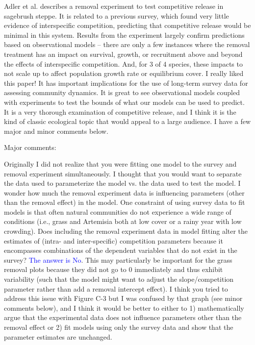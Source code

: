 \documentclass[12pt]{article}
\newcommand{\response}{\textcolor{blue}}
\begin{document}
{Adler et al. describes a removal experiment to test competitive release in sagebrush steppe. It is related to a previous survey, which found very little evidence of interspecific competition, predicting that competitive release would be minimal in this system. Results from the experiment largely confirm predictions based on observational models – there are only a few instances where the removal treatment has an impact on survival, growth, or recruitment above and beyond the effects of interspecific competition. And, for 3 of 4 species, these impacts to not scale up to affect population growth rate or equilibrium cover. I really liked this paper! It has important implications for the use of long-term survey data for assessing community dynamics. It is great to see observational models coupled with experiments to test the bounds of what our models can be used to predict. It is a very thorough examination of competitive release, and I think it is the kind of classic ecological topic that would appeal to a large audience. I have a few major and minor comments below.

Major comments:

Originally I did not realize that you were fitting one model to the survey and removal experiment simultaneously. I thought that you would want to separate the data used to parameterize the model vs. the data used to test the model.  I wonder how much the removal experiment data is influencing parameters (other than the removal effect) in the model. One constraint of using survey data to fit models is that often natural communities do not experience a wide range of conditions (i.e., grass and Artemisia both at low cover or a rainy year with low crowding). Does including the removal experiment data in model fitting alter the estimates of (intra- and inter-specific) competition parameters because it encompasses combinations of the dependent variables that do not exist in the survey? \response{The answer is No}. This may particularly be important for the grass removal plots because they did not go to 0 immediately and thus exhibit variability (such that the model might want to adjust the slope/competition parameter rather than add a removal intercept effect). I think you tried to address this issue with Figure C-3 but I was confused by that graph (see minor comments below), and I think it would be better to either to 1) mathematically argue that the experimental data does not influence parameters other than the removal effect or 2) fit models using only the survey data and show that the parameter estimates are unchanged. 

}
\end{document}
